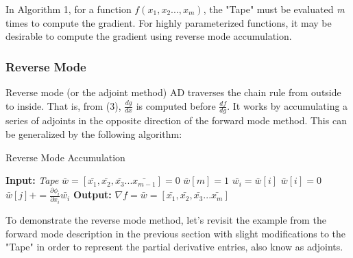 \documentclass[oneside]{article}
\begin{document}
In Algorithm 1, for a function $f(x_1,x_2..., x_m)$, the "Tape" must be evaluated \textit{m} times to compute the gradient. For highly parameterized functions, it may be desirable to compute the gradient using reverse mode accumulation.

\subsubsection{Reverse Mode}
Reverse mode (or the adjoint method) AD traverses the chain rule from outside to inside. That is, from (3),  \textit{$\frac{dg}{dx}$} is computed before \textit{$\frac{df}{dg}$}. It works by accumulating a series of adjoints in the opposite direction of the forward mode method. This can be generalized by the following algorithm:
\begin{algorithm*}
  \caption{Reverse Mode Accumulation \cite{griewank2}}
  \begin{algorithmic}[1]
\State \textbf{Input:} \textit{Tape}
\State $\bar{w} = [\bar{ x_1},\bar{x_2},\bar{x_3}...\bar{x_{m-1}}] = 0$
\State $\bar{w}[m] = 1$
\State $\bar{w_i}=\bar{w}[i]$
\State $\bar{w}[i] = 0$
\State $\bar{w}[j] +=  \frac{\partial \phi_i}{\partial x_i}\bar{w_i}$
\EndFor
\EndFor
\State \textbf{Output:} $\nabla f = \bar{w} =  [\bar{ x_1},\bar{x_2},\bar{x_3}...\bar{x_{m}}]$
\end{algorithmic}
 \end{algorithm*}

To demonstrate the reverse mode method, let's revisit the example from the forward mode description in the previous section with slight modifications to the "Tape" in order to represent the partial derivative entries, also know as adjoints. \\
\end{document}
